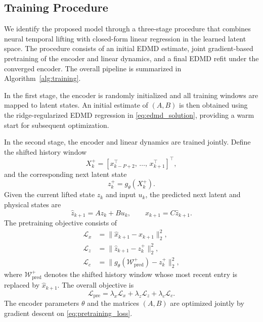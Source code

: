 \documentclass[journal]{IEEEtran}
\begin{document}
\subsection{Training Procedure}
\label{sec:training}

We identify the proposed model through a three-stage procedure that combines neural temporal lifting with closed-form linear regression in the learned latent space. The procedure consists of an initial EDMD estimate, joint gradient-based pretraining of the encoder and linear dynamics, and a final EDMD refit under the converged encoder. The overall pipeline is summarized in Algorithm~\ref{alg:training}.

In the first stage, the encoder is randomly initialized and all training windows are mapped to latent states. An initial estimate of $(A,B)$ is then obtained using the ridge-regularized EDMD regression in \eqref{eq:edmd_solution}, providing a warm start for subsequent optimization.

In the second stage, the encoder and linear dynamics are trained jointly. Define the shifted history window
\begin{equation}
    X_k^{+} = [x_{k-P+2}^\top,\,\ldots,\,x_{k+1}^\top]^\top,
\end{equation}
and the corresponding next latent state
\begin{equation}
    z_k^{+} = g_\theta(X_k^{+}).
\end{equation}
Given the current lifted state $z_k$ and input $u_k$, the predicted next latent and physical states are
\begin{equation}
    \hat{z}_{k+1} = A z_k + B u_k, 
    \qquad
    \hat{x}_{k+1} = C \hat{z}_{k+1}.
\end{equation}
The pretraining objective consists of
\begin{align}
    \mathcal{L}_{x} &= \|\hat{x}_{k+1}-x_{k+1}\|_2^2, \label{eq:loss_x}\\
    \mathcal{L}_{z} &= \|\hat{z}_{k+1}-z_k^{+}\|_2^2, \label{eq:loss_z}\\
    \mathcal{L}_{c} &= \bigl\|g_\theta(\mathcal{W}^{+}_{\mathrm{pred}})-z_k^{+}\bigr\|_2^2, \label{eq:loss_c}
\end{align}
where $\mathcal{W}^{+}_{\mathrm{pred}}$ denotes the shifted history window whose most recent entry is replaced by $\hat{x}_{k+1}$. The overall objective is
\begin{equation}
    \mathcal{L}_{\mathrm{pre}} = \lambda_x \mathcal{L}_x + \lambda_z \mathcal{L}_z + \lambda_c \mathcal{L}_c.
    \label{eq:pretraining_loss}
\end{equation}
The encoder parameters $\theta$ and the matrices $(A,B)$ are optimized jointly by gradient descent on \eqref{eq:pretraining_loss}.
\end{document}
